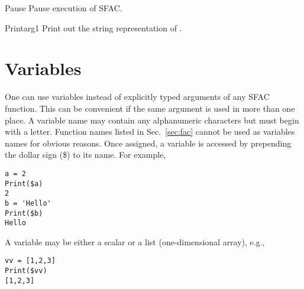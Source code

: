 \begin{fundesc}{Pause}{}
Pause execution of SFAC.
\end{fundesc}

\begin{fundesc}{Print}{arg1}
Print out the string representation of .
\end{fundesc}


\section{Variables}
One can use variables instead of explicitly typed arguments of any SFAC
function. This can be convenient if the same argument is used in more than one
place. A variable name may contain any alphanumeric characters but must begin
with a letter. Function names listed in Sec.~\ref{sec:fac} cannot be used as
variables names for obvious reasons. Once assigned, a variable is accessed by
prepending the dollar sign (\$) to its name. For example,
\begin{verbatim}
a = 2
Print($a)
2
b = 'Hello'
Print($b)
Hello
\end{verbatim}
A variable may be either a scalar or a list (one-dimensional array), e.g.,
\begin{verbatim}
vv = [1,2,3]
Print($vv)
[1,2,3]
\end{verbatim}
